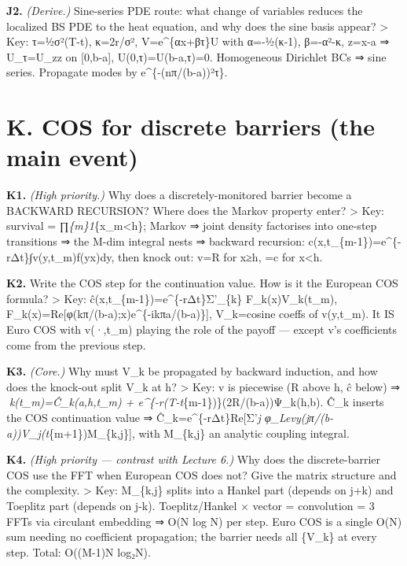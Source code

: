\documentclass[
  11pt,
]{article}
\begin{document}
\textbf{J2.} \emph{(Derive.)} Sine-series PDE route: what change of
variables reduces the localized BS PDE to the heat equation, and why
does the sine basis appear? \textgreater{} Key: τ=½σ²(T-t), κ=2r/σ²,
V=e\^{}\{αx+βτ\}U with α=-½(κ-1), β=-α²-κ, z=x-a ⇒ U\_τ=U\_zz on
{[}0,b-a{]}, U(0,τ)=U(b-a,τ)=0. Homogeneous Dirichlet BCs ⇒ sine series.
Propagate modes by e\^{}\{-(nπ/(b-a))²τ\}.

\hypertarget{k.-cos-for-discrete-barriers-the-main-event}{%
\section{K. COS for discrete barriers (the main
event)}\label{k.-cos-for-discrete-barriers-the-main-event}}

\textbf{K1.} \emph{(High priority.)} Why does a discretely-monitored
barrier become a BACKWARD RECURSION? Where does the Markov property
enter? \textgreater{} Key: survival = ∏\emph{\{m\}1}\{x\_m\textless h\};
Markov ⇒ joint density factorises into one-step transitions ⇒ the M-dim
integral nests ⇒ backward recursion:
c(x,t\_\{m-1\})=e\^{}\{-rΔt\}∫v(y,t\_m)f(y\textbar x)dy, then knock out:
v=R for x≥h, =c for x\textless h.

\textbf{K2.} Write the COS step for the continuation value. How is it
the European COS formula? \textgreater{} Key:
ĉ(x,t\_\{m-1\})=e\^{}\{-rΔt\}Σ'\_\{k\} F\_k(x)V\_k(t\_m),
F\_k(x)=Re{[}φ(kπ/(b-a);x)e\^{}\{-ikπa/(b-a)\}{]}, V\_k=cosine coeffs of
v(y,t\_m). It IS Euro COS with v(·,t\_m) playing the role of the payoff
--- except v's coefficients come from the previous step.

\textbf{K3.} \emph{(Core.)} Why must V\_k be propagated by backward
induction, and how does the knock-out split V\_k at h? \textgreater{}
Key: v is piecewise (R above h, ĉ below) ⇒ \emph{k(t\_m)=Ĉ\_k(a,h,t\_m)
+ e\^{}\{-r(T-t}\{m-1\})\}(2R/(b-a))Ψ\_k(h,b). Ĉ\_k inserts the COS
continuation value ⇒ Ĉ\_k=e\^{}\{-rΔt\}Re{[}Σ'\emph{j
φ\_Levy(jπ/(b-a))V\_j(t}\{m+1\})M\_\{k,j\}{]}, with M\_\{k,j\} an
analytic coupling integral.

\textbf{K4.} \emph{(High priority --- contrast with Lecture 6.)} Why
does the discrete-barrier COS use the FFT when European COS does not?
Give the matrix structure and the complexity. \textgreater{} Key:
M\_\{k,j\} splits into a Hankel part (depends on j+k) and Toeplitz part
(depends on j-k). Toeplitz/Hankel × vector = convolution = 3 FFTs via
circulant embedding ⇒ O(N log N) per step. Euro COS is a single O(N) sum
needing no coefficient propagation; the barrier needs all \{V\_k\} at
every step. Total: O((M-1)N log₂N).
\end{document}
